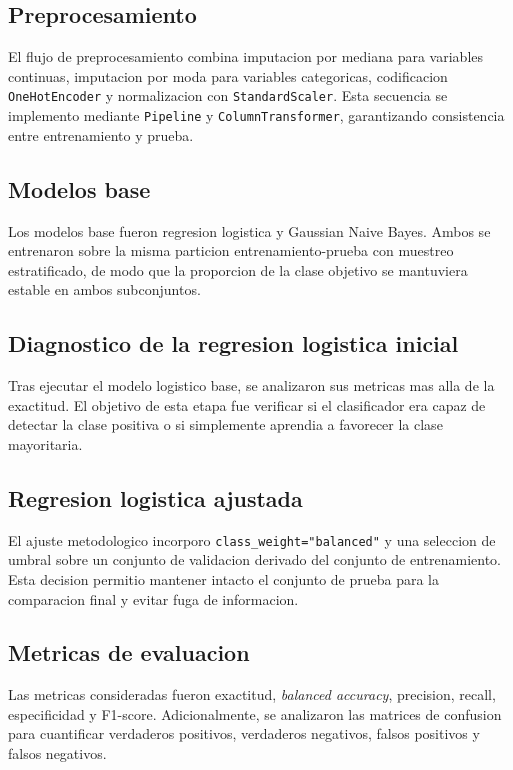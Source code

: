 \documentclass[conference]{IEEEtran}
\begin{document}
\subsection{Preprocesamiento}
El flujo de preprocesamiento combina imputacion por mediana para variables continuas, imputacion por moda para variables categoricas, codificacion \texttt{OneHotEncoder} y normalizacion con \texttt{StandardScaler}. Esta secuencia se implemento mediante \texttt{Pipeline} y \texttt{ColumnTransformer}, garantizando consistencia entre entrenamiento y prueba.

\subsection{Modelos base}
Los modelos base fueron regresion logistica y Gaussian Naive Bayes. Ambos se entrenaron sobre la misma particion entrenamiento-prueba con muestreo estratificado, de modo que la proporcion de la clase objetivo se mantuviera estable en ambos subconjuntos.

\subsection{Diagnostico de la regresion logistica inicial}
Tras ejecutar el modelo logistico base, se analizaron sus metricas mas alla de la exactitud. El objetivo de esta etapa fue verificar si el clasificador era capaz de detectar la clase positiva o si simplemente aprendia a favorecer la clase mayoritaria.

\subsection{Regresion logistica ajustada}
El ajuste metodologico incorporo \texttt{class\_weight="balanced"} y una seleccion de umbral sobre un conjunto de validacion derivado del conjunto de entrenamiento. Esta decision permitio mantener intacto el conjunto de prueba para la comparacion final y evitar fuga de informacion.

\subsection{Metricas de evaluacion}
Las metricas consideradas fueron exactitud, \textit{balanced accuracy}, precision, recall, especificidad y F1-score. Adicionalmente, se analizaron las matrices de confusion para cuantificar verdaderos positivos, verdaderos negativos, falsos positivos y falsos negativos.
\end{document}
